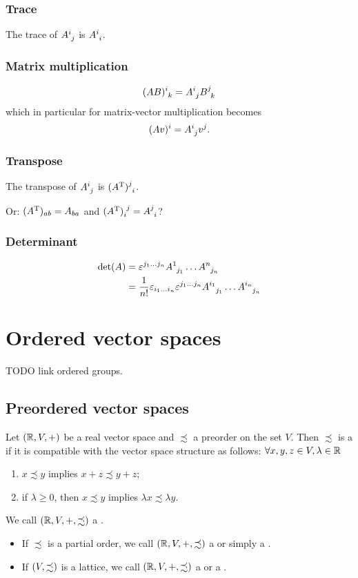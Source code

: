 \subsection{Trace}
The trace of $\tensor{A}{^i_j}$ is $\tensor{A}{^i_i}$.
\subsection{Matrix multiplication}
\[ \tensor{(AB)}{^{i}_{k}}=\tensor{A}{^{i}_{j}}\tensor{B}{^{j}_{k}} \]
which in particular for matrix-vector multiplication becomes
\[ (Av)^i = \tensor{A}{^i_j} v^j. \]
\subsection{Transpose}
The transpose of $\tensor{A}{^i_j}$ is $\tensor{(A^\transp)}{^j_i}$.

Or: $(A^{\mathrm{T}})_{ab} = A_{ba}$ and $\tensor{(A^\transp)}{_i^j} = \tensor{A}{^j_i}$?
\subsection{Determinant}
\begin{align*}
\det(A) &= \varepsilon^{j_1\ldots j_n}\tensor{A}{^{1}_{j_1}}\ldots \tensor{A}{^{n}_{j_n}} \\
&= \frac{1}{n!}\varepsilon_{i_1\ldots i_n}\varepsilon^{j_1\ldots j_n}\tensor{A}{^{i_1}_{j_1}}\ldots \tensor{A}{^{i_n}_{j_n}}
\end{align*}

\chapter{Ordered vector spaces}
TODO link ordered groups.
\section{Preordered vector spaces}
\begin{definition}
Let $\sSet{\R, V, +}$ be a real vector space and $\precsim$ a preorder on the set $V$. Then $\precsim$ is a  if it is compatible with the vector space structure as follows: $\forall x,y,z\in V, \lambda\in\mathbb{R}$
\begin{enumerate}
\item $x\precsim y$ implies $x+z \precsim y+z$;
\item if $\lambda\geq 0$, then $x \precsim y$ implies $\lambda x \precsim \lambda y$.
\end{enumerate}
We call $(\mathbb{R}, V, +, \precsim)$ a .

\begin{itemize}
\item If $\precsim$ is a partial order, we call $(\mathbb{R}, V, +, \precsim)$ a  or simply a .
\item If $\sSet{V, \precsim}$ is a lattice, we call $(\mathbb{R}, V, +, \precsim)$ a  or a .
\end{itemize}
\end{definition}

